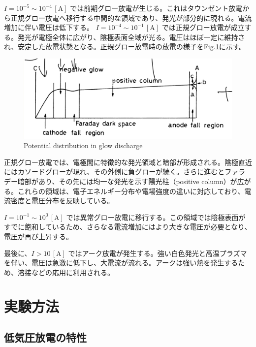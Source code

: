 \documentclass[dvipdfmx]{jsarticle}
\newcommand{\figlab}[1]{Fig.\ref{fig:#1}}%
\begin{document}
$I = 10^{-5} \sim 10^{-4}\,\mathrm{[A]}$ では前期グロー放電が生じる。これはタウンゼント放電から正規グロー放電へ移行する中間的な領域であり、発光が部分的に現れる。電流増加に伴い電圧は低下する。
$I = 10^{-4} \sim 10^{-1}\,\mathrm{[A]}$ では正規グロー放電が成立する。発光が電極全体に広がり、陰極表面全域が光る。電圧はほぼ一定に維持され、安定した放電状態となる。正規グロー放電時の放電の様子を\figlab{2}に示す。

\begin{figure}[H]
 \centering
 \includegraphics[scale=0.4]{assets/glow-discharge.png}
 \caption{Potential distribution in glow discharge}\label{fig:2}
\end{figure}

正規グロー放電では、電極間に特徴的な発光領域と暗部が形成される。陰極直近にはカソードグローが現れ、その外側に負グローが続く。さらに進むとファラデー暗部があり、その先には均一な発光を示す陽光柱（positive column）が広がる。これらの領域は、電子エネルギー分布や電場強度の違いに対応しており、電流密度と電圧分布を反映している。


$I = 10^{-1} \sim 10^{0}\,\mathrm{[A]}$ では異常グロー放電に移行する。この領域では陰極表面がすでに飽和しているため、さらなる電流増加にはより大きな電圧が必要となり、電圧が再び上昇する。

最後に、$I > 10\,\mathrm{[A]}$ ではアーク放電が発生する。強い白色発光と高温プラズマを伴い、電圧は急激に低下し、大電流が流れる。アークは強い熱を発生するため、溶接などの応用に利用される。
\section{実験方法}
    \subsection{低気圧放電の特性}
\end{document}
